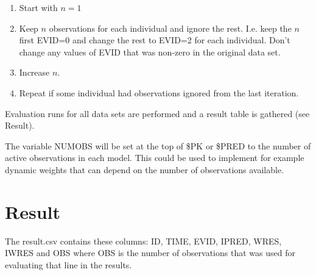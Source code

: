 \begin{enumerate}
    \item Start with $n=1$
    \item Keep $n$ observations for each individual and ignore the rest. I.e. keep the $n$ first EVID=0 and change the rest to EVID=2 for each individual. Don't change any values of EVID that was non-zero in the original data set.
    \item Increase $n$.
    \item Repeat if some individual had observations ignored from the last iteration.
\end{enumerate}

Evaluation runs for all data sets are performed and a result table is gathered (see Result).

The variable NUMOBS will be set at the top of \$PK or \$PRED to the number of active observations in each model. This could be used to implement for example dynamic weights that can depend on the number of observations available.

\section{Result}

The result.csv contains these columns: ID, TIME, EVID, IPRED, WRES, IWRES and OBS where OBS is the number of observations that was used for evaluating that line in the results.


